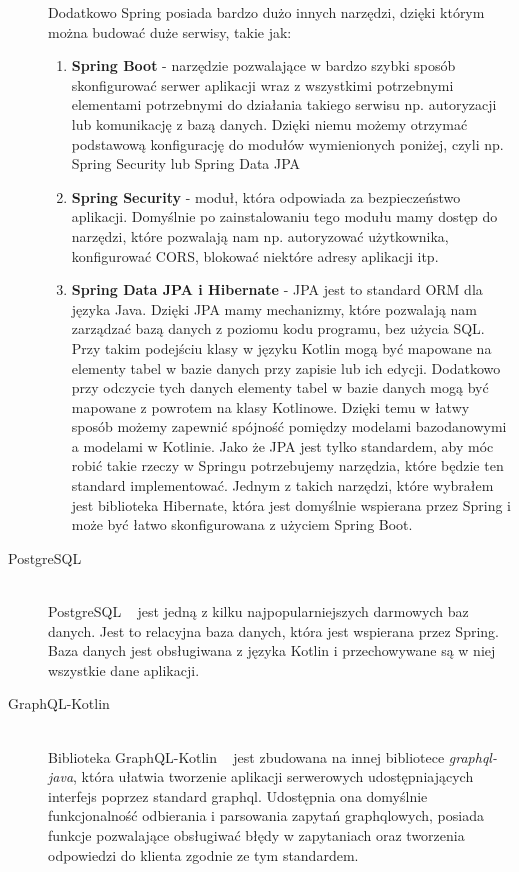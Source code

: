 \begin{description}
    Dodatkowo Spring posiada bardzo dużo innych narzędzi, dzięki którym można budować duże serwisy, takie jak:
    \begin{enumerate}
      \item \textbf{Spring Boot} - narzędzie pozwalające w bardzo szybki sposób skonfigurować serwer aplikacji wraz z wszystkimi potrzebnymi elementami potrzebnymi do działania takiego serwisu np. autoryzacji lub komunikację z bazą danych. Dzięki niemu możemy otrzymać podstawową konfigurację do modułów wymienionych poniżej, czyli np. Spring Security lub Spring Data JPA
      \item \textbf{Spring Security} - moduł, która odpowiada za bezpieczeństwo aplikacji. Domyślnie po zainstalowaniu tego modułu mamy dostęp do narzędzi, które pozwalają nam np. autoryzować użytkownika, konfigurować CORS, blokować niektóre adresy aplikacji itp.
      \item \textbf{Spring Data JPA i Hibernate} - JPA jest to standard ORM dla języka Java. Dzięki JPA mamy mechanizmy, które pozwalają nam zarządzać bazą danych z poziomu kodu programu, bez użycia SQL. Przy takim podejściu klasy w języku Kotlin mogą być mapowane na elementy tabel w bazie danych przy zapisie lub ich edycji. Dodatkowo przy odczycie tych danych elementy tabel w bazie danych mogą być mapowane z powrotem na klasy Kotlinowe. Dzięki temu w łatwy sposób możemy zapewnić spójność pomiędzy modelami bazodanowymi a modelami w Kotlinie. Jako że JPA jest tylko standardem, aby móc robić takie rzeczy w Springu potrzebujemy narzędzia, które będzie ten standard implementować. Jednym z takich narzędzi, które wybrałem jest biblioteka Hibernate, która jest domyślnie wspierana przez Spring i może być łatwo skonfigurowana z użyciem Spring Boot.
    \end{enumerate}

  \item[PostgreSQL] \hfill \\ PostgreSQL ~\cite{ref_postgre_doc} jest jedną z kilku najpopularniejszych darmowych baz danych. Jest to relacyjna baza danych, która jest wspierana przez Spring. Baza danych jest obsługiwana z języka Kotlin i przechowywane są w niej wszystkie dane aplikacji.
  \item[GraphQL-Kotlin] \hfill \\ Biblioteka GraphQL-Kotlin ~\cite{ref_gqlKotlin_doc} jest zbudowana na innej bibliotece \emph{graphql-java}, która ułatwia tworzenie aplikacji serwerowych udostępniających interfejs poprzez standard graphql. Udostępnia ona domyślnie funkcjonalność odbierania i parsowania zapytań graphqlowych, posiada funkcje pozwalające obsługiwać błędy w zapytaniach oraz tworzenia odpowiedzi do klienta zgodnie ze tym standardem.
\end{description}


